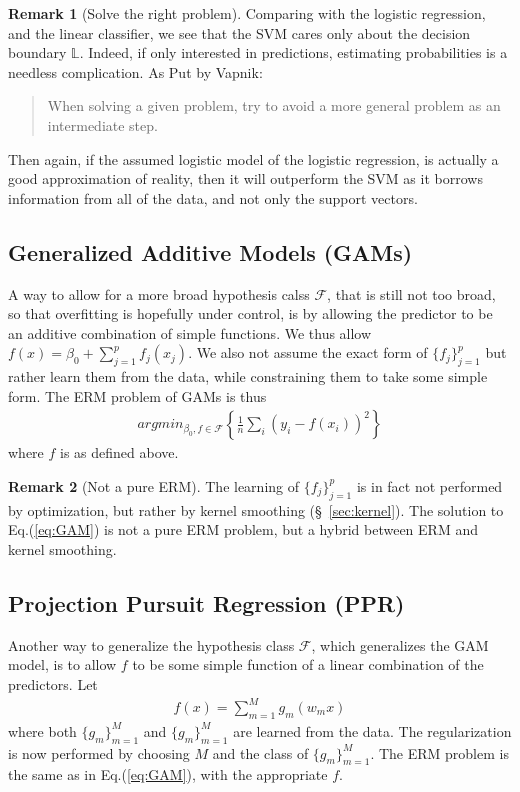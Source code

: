 \documentclass[12pt,a4paper]{article}
\theoremstyle{plain}
\theoremstyle{definition}
\newtheorem{remark}{Remark}
\newcommand{\argmin}[2]{argmin_{#1}\left\{ #2 \right\}}
\newcommand{\hyp}{f}
\newcommand{\hypclass}{\mathcal{F}}
\newcommand{\plane}{\mathbb{L}}
\begin{document}
\begin{remark}[Solve the right problem]
Comparing with the logistic regression, and the linear classifier, we see that the SVM cares only about the decision boundary $\plane$. Indeed, if only interested in predictions, estimating probabilities is a needless complication. As Put by Vapnik: 
\begin{quote}
When solving a given problem, try to avoid a more general problem as an intermediate
step.
\end{quote}
Then again, if the assumed logistic model of the logistic regression, is actually a good approximation of reality, then it will outperform the SVM as it borrows information from all of the data, and not only the support vectors. 
\end{remark}


\subsection{Generalized Additive Models (GAMs)}
\label{sec:gam}
A way to allow for a more broad hypothesis calss $\hypclass$, that is still not too broad, so that overfitting is hopefully under control, is by allowing the predictor to be an additive combination of simple functions.
We thus allow $\hyp(x)=\beta_0 + \sum_{j=1}^p f_j(x_j)$. We also not assume the exact form of $\{f_j\}_{j=1}^p$ but rather learn them from the data, while constraining them to take some simple form.
The ERM problem of GAMs is thus
\begin{align}
\label{eq:GAM}
	 \argmin{\beta_0,\hyp \in \hypclass}{\frac{1}{n}\sum_i (y_i-\hyp(x_i))^2  }
\end{align}
where $\hyp$ is as defined above.

\begin{remark}[Not a pure ERM]
The learning of $\{f_j\}_{j=1}^p$ is in fact not performed by optimization, but rather by kernel smoothing (\S~\ref{sec:kernel}).
The solution to Eq.(\ref{eq:GAM}) is not a pure ERM problem, but a hybrid between ERM and kernel smoothing.
\end{remark}



\subsection{Projection Pursuit Regression (PPR)}
\label{sec:ppr}
Another way to generalize the hypothesis class $\hypclass$, which generalizes the GAM model, is to allow $\hyp$ to be some simple function of a linear combination of the predictors. Let 
\begin{align}
\label{eq:PPR}
	\hyp(x)=\sum_{m=1}^M g_m(w_m x)
\end{align}
where both $\{g_m\}_{m=1}^M$ and $\{g_m\}_{m=1}^M$ are learned from the data. 
The regularization is now performed by choosing $M$ and the class of $\{g_m\}_{m=1}^M$.
The ERM problem is the same as in Eq.(\ref{eq:GAM}), with the appropriate $\hyp$.
\end{document}

